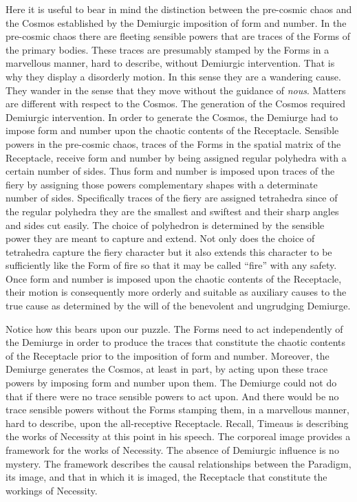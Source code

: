 Here it is useful to bear in mind the distinction between the pre-cosmic chaos and the Cosmos established by the Demiurgic imposition of form and number. In the pre-cosmic chaos there are fleeting sensible powers that are traces of the Forms of the primary bodies. These traces are presumably stamped by the Forms in a marvellous manner, hard to describe, without Demiurgic intervention. That is why they display a disorderly motion. In this sense they are a wandering cause. They wander in the sense that they move without the guidance of \emph{nous}. Matters are different with respect to the Cosmos. The generation of the Cosmos required Demiurgic intervention. In order to generate the Cosmos, the Demiurge had to impose form and number upon the chaotic contents of the Receptacle. Sensible powers in the pre-cosmic chaos, traces of the Forms in the spatial matrix of the Receptacle, receive form and number by being assigned regular polyhedra with a certain number of sides. Thus form and number is imposed upon traces of the fiery by assigning those powers complementary shapes with a determinate number of sides. Specifically traces of the fiery are assigned tetrahedra since of the regular polyhedra they are the smallest and swiftest and their sharp angles and sides cut easily. The choice of polyhedron is determined by the sensible power they are meant to capture and extend. Not only does the choice of tetrahedra capture the fiery character but it also extends this character to be sufficiently like the Form of fire so that it may be called ``fire'' with any safety.  Once form and number is imposed upon the chaotic contents of the Receptacle, their motion is consequently more orderly and suitable as auxiliary causes to the true cause as determined by the will of the benevolent and ungrudging Demiurge. 

Notice how this bears upon our puzzle. The Forms need to act independently of the Demiurge in order to produce the traces that constitute the chaotic contents of the Receptacle prior to the imposition of form and number. Moreover, the Demiurge generates the Cosmos, at least in part, by acting upon these trace powers by imposing form and number upon them. The Demiurge could not do that if there were no trace sensible powers to act upon. And there would be no trace sensible powers without the Forms stamping them, in a marvellous manner, hard to describe, upon the all-receptive Receptacle. Recall, Timeaus is describing the works of Necessity at this point in his speech. The corporeal image provides a framework for the works of Necessity. The absence of Demiurgic influence is no mystery. The framework describes the causal relationships between the Paradigm, its image, and that in which it is imaged, the Receptacle that constitute the workings of Necessity.

